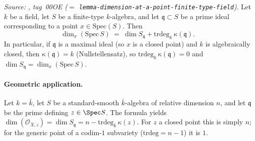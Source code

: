 \begin{lemma}
  \label{lem:smooth_algebra_krull_dim_formula}
  \textit{Source: \cite{stacks-project}, tag~00OE (\(=\) \texttt{lemma-dimension-at-a-point-finite-type-field}).}
  Let \(k\) be a field, let \(S\) be a finite-type \(k\)-algebra, and let
  \(\mathfrak q \subset S\) be a prime ideal corresponding to a point
  \(x \in \mathrm{Spec}(S)\). Then
  \[
    \dim_x(\mathrm{Spec}\,S)
    \;=\; \dim S_{\mathfrak q} + \mathrm{trdeg}_k\,\kappa(\mathfrak q).
  \]
  In particular, if \(\mathfrak q\) is a maximal ideal (so \(x\) is a
  closed point) and \(k\) is algebraically closed, then
  \(\kappa(\mathfrak q) = k\) (Nullstellensatz), so
  \(\mathrm{trdeg}_k\,\kappa(\mathfrak q) = 0\) and
  \(\dim S_{\mathfrak q} = \dim_x(\mathrm{Spec}\,S)\).

  \paragraph{Geometric application.} Let \(k = \bar k\), let
  \(S\) be a standard-smooth \(\bar k\)-algebra of relative dimension
  \(n\), and let \(\mathfrak q\) be the prime defining \(z \in \Spec S\).  The
  formula yields \(\dim(\mathcal O_{X, z}) = \dim S_{\mathfrak q} = n -
  \mathrm{trdeg}_{\bar k}\,\kappa(z)\). For \(z\) a closed point this is
  simply \(n\); for the generic point of a codim-\(1\) subvariety
  (\(\mathrm{trdeg} = n - 1\)) it is \(1\).
\end{lemma}

